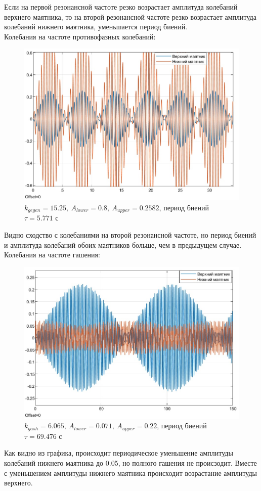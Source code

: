 \documentclass{article}
\begin{document}
	Если на первой резонансной частоте резко возрастает амплитуда колебаний верхнего маятника, то на второй резонансной частоте резко возрастает амплитуда колебаний нижнего маятника, уменьшается период биений.\\
	Колебания на частоте противофазных колебаний:
	\begin{figure}[H]
		\centering
		\includegraphics[width=0.7\linewidth]{kgegen}
		\caption{$k_{gegen} = 15.25,\ A_{lower} = 0.8,\ A_{upper} = 0.2582$, период биений $\tau = 5.771$ с}
		\label{fig:kgegen}
	\end{figure}
	Видно сходство с колебаниями на второй резонансной частоте, но период биений и амплитуда колебаний обоих маятников больше, чем в предыдущем случае.\\
	Колебания на частоте гашения:
	\begin{figure}[H]
		\centering
		\includegraphics[width=0.7\linewidth]{kgash}
		\caption{$k_{gash} = 6.065,\ A_{lower} = 0.071,\ A_{upper} = 0.22$, период биений $\tau = 69.476$ с}
		\label{fig:kgash}
	\end{figure}
	Как видно из графика, происходит периодическое уменьшение амплитуды колебаний нижнего маятника до 0.05, но полного гашения не происзодит. Вместе с уменьшением амплитуды нижнего маятника происходит возрастание амплитуды верхнего.	
\end{document}
